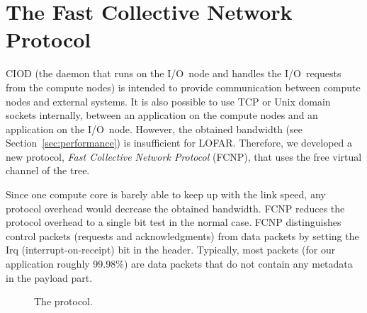 \documentclass[journal]{IEEEtran}
\begin{document}


\section{The Fast Collective Network Protocol}
\label{sec:FCNP}

CIOD (the daemon that runs on the I/O~node and handles the I/O~requests from
the compute nodes) is intended to provide communication between compute nodes
and external systems.
It is also possible to use TCP or Unix domain sockets internally,
between an application on the compute nodes and an application on the I/O~node.
However, the obtained bandwidth (see Section~\ref{sec:performance}) is
insufficient for LOFAR.
Therefore, we developed a new protocol, \emph{Fast Collective Network
Protocol\/} (FCNP), that uses the free virtual channel of the tree.

Since one compute core is barely able to keep up with the link speed,
any protocol overhead would decrease the obtained bandwidth.
FCNP reduces the protocol overhead to a single bit test in the normal case.
FCNP distinguishes control packets (requests and acknowledgments) from data
packets by setting the Irq (interrupt-on-receipt) bit in the header.
Typically, most packets (for our application roughly 99.98\%) are data packets
that do not contain any metadata in the payload part.

\begin{figure}[h]
\hfill
{}
\caption{The protocol.}
\label{fig:FCNP-protocol}
\end{figure}
\end{document}
